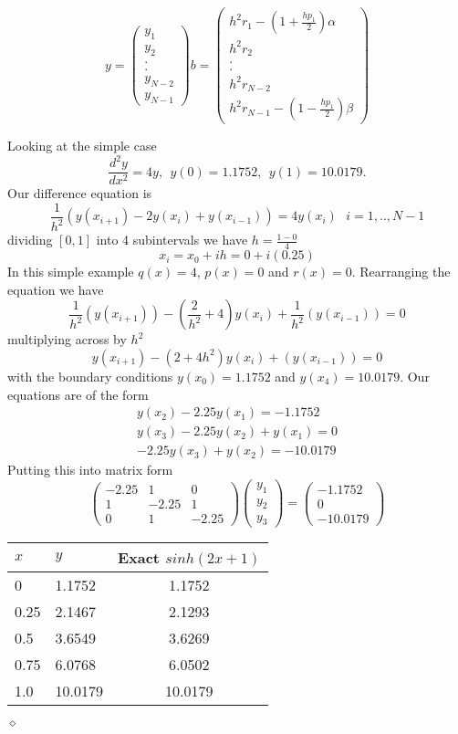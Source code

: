 \[
y =\left( \begin{array}{c}
y_1 \\
y_2 \\
. \\
. \\
y_{N-2} \\
y_{N-1} 
\end{array}\right)
b =\left( \begin{array}{c}
h^2r_1-\left( 1+\frac{hp_1}{2}\right)\alpha \\
h^2r_2 \\
. \\
. \\
h^2r_{N-2} \\
h^2r_{N-1}-\left( 1-\frac{hp_1}{2}\right)\beta
\end{array}\right)
\]
\begin{example}
Looking at the simple case
\[\frac{d^2y}{dx^2}=4y, \ \ y(0)=1.1752, \ \ y(1)=10.0179. \]
Our difference equation is
\[
\frac{1}{h^2}(y(x_{i+1})-2y(x_i)+y(x_{i-1}))=4y(x_i) \ \ \ i=1,..,N-1 \]
dividing $[0,1]$ into 4 subintervals we have $h=\frac{1-0}{4}$
\[x_i=x_0+ih=0+i(0.25)\]
In this simple example $q(x)=4$, $p(x)=0$ and $r(x)=0$. Rearranging the
equation we have
\[ \frac{1}{h^2} (y(x_{i+1})) -\left(\frac{2}{h^2}+4\right)y(x_i) +\frac{1}{h^2} (y(x_{i-1}))=0\]
multiplying across by $h^2$
\[  y(x_{i+1}) -(2+4h^2)y(x_i) + (y(x_{i-1}))=0\]
with the boundary conditions $y(x_0)=1.1752$ and $y(x_4)=10.0179$.
Our equations are of the form
\begin{eqnarray*}
y(x_2)-2.25y(x_1)=-1.1752\\
y(x_3)-2.25y(x_2)+y(x_1)=0\\
-2.25y(x_3)+y(x_2)=-10.0179
\end{eqnarray*}
Putting this into matrix form 
\[\left(\begin{array}{ccc} -2.25&1&0\\
1&-2.25&1\\
0&1&-2.25
\end{array}\right)
\left(\begin{array}{c} y_1\\
y_2\\
y_3
\end{array}\right)
=
\left(\begin{array}{c}-1.1752\\
0\\
-10.0179 \end{array}\right)
\]
\begin{center}
\begin{tabular}{l|l|c}
$x$ & $y$ & Exact $sinh(2x+1)$\\
\hline
0 & 1.1752&1.1752\\
0.25 & 2.1467 & 2.1293\\
0.5 & 3.6549& 3.6269\\
0.75 & 6.0768& 6.0502\\
1.0& 10.0179& 10.0179\\
\end{tabular}
\end{center}
\end{example}$\diamond$
